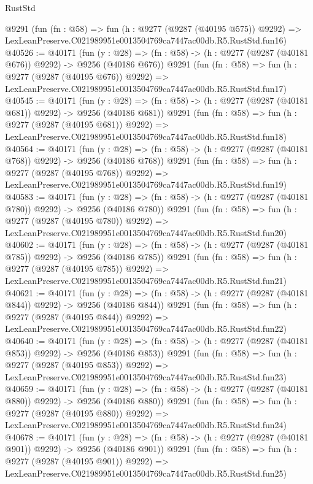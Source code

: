 \begin{lexlean}{RustStd}
\begin{coremodule}
    @9291
    (fun (fn : @58) =>
    fun (h : @9277 (@9287 (@40195 @575)) @9292) =>
    LexLeanPreserve.C021989951e0013504769ca7447ac00db.R5.RustStd.fun16)
@40526 := @40171
    (fun (y : @28) => (fn : @58) -> (h : @9277 (@9287 (@40181 @676)) @9292) -> @9256 (@40186 @676))
    @9291
    (fun (fn : @58) =>
    fun (h : @9277 (@9287 (@40195 @676)) @9292) =>
    LexLeanPreserve.C021989951e0013504769ca7447ac00db.R5.RustStd.fun17)
@40545 := @40171
    (fun (y : @28) => (fn : @58) -> (h : @9277 (@9287 (@40181 @681)) @9292) -> @9256 (@40186 @681))
    @9291
    (fun (fn : @58) =>
    fun (h : @9277 (@9287 (@40195 @681)) @9292) =>
    LexLeanPreserve.C021989951e0013504769ca7447ac00db.R5.RustStd.fun18)
@40564 := @40171
    (fun (y : @28) => (fn : @58) -> (h : @9277 (@9287 (@40181 @768)) @9292) -> @9256 (@40186 @768))
    @9291
    (fun (fn : @58) =>
    fun (h : @9277 (@9287 (@40195 @768)) @9292) =>
    LexLeanPreserve.C021989951e0013504769ca7447ac00db.R5.RustStd.fun19)
@40583 := @40171
    (fun (y : @28) => (fn : @58) -> (h : @9277 (@9287 (@40181 @780)) @9292) -> @9256 (@40186 @780))
    @9291
    (fun (fn : @58) =>
    fun (h : @9277 (@9287 (@40195 @780)) @9292) =>
    LexLeanPreserve.C021989951e0013504769ca7447ac00db.R5.RustStd.fun20)
@40602 := @40171
    (fun (y : @28) => (fn : @58) -> (h : @9277 (@9287 (@40181 @785)) @9292) -> @9256 (@40186 @785))
    @9291
    (fun (fn : @58) =>
    fun (h : @9277 (@9287 (@40195 @785)) @9292) =>
    LexLeanPreserve.C021989951e0013504769ca7447ac00db.R5.RustStd.fun21)
@40621 := @40171
    (fun (y : @28) => (fn : @58) -> (h : @9277 (@9287 (@40181 @844)) @9292) -> @9256 (@40186 @844))
    @9291
    (fun (fn : @58) =>
    fun (h : @9277 (@9287 (@40195 @844)) @9292) =>
    LexLeanPreserve.C021989951e0013504769ca7447ac00db.R5.RustStd.fun22)
@40640 := @40171
    (fun (y : @28) => (fn : @58) -> (h : @9277 (@9287 (@40181 @853)) @9292) -> @9256 (@40186 @853))
    @9291
    (fun (fn : @58) =>
    fun (h : @9277 (@9287 (@40195 @853)) @9292) =>
    LexLeanPreserve.C021989951e0013504769ca7447ac00db.R5.RustStd.fun23)
@40659 := @40171
    (fun (y : @28) => (fn : @58) -> (h : @9277 (@9287 (@40181 @880)) @9292) -> @9256 (@40186 @880))
    @9291
    (fun (fn : @58) =>
    fun (h : @9277 (@9287 (@40195 @880)) @9292) =>
    LexLeanPreserve.C021989951e0013504769ca7447ac00db.R5.RustStd.fun24)
@40678 := @40171
    (fun (y : @28) => (fn : @58) -> (h : @9277 (@9287 (@40181 @901)) @9292) -> @9256 (@40186 @901))
    @9291
    (fun (fn : @58) =>
    fun (h : @9277 (@9287 (@40195 @901)) @9292) =>
    LexLeanPreserve.C021989951e0013504769ca7447ac00db.R5.RustStd.fun25)

\end{coremodule}
\end{lexlean}

